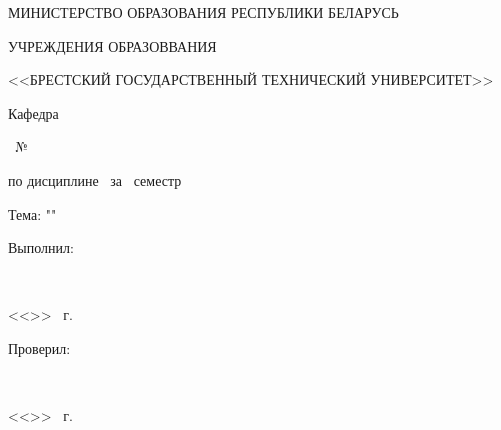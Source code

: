 \begin{center}
    МИНИСТЕРСТВО ОБРАЗОВАНИЯ РЕСПУБЛИКИ БЕЛАРУСЬ

    УЧРЕЖДЕНИЯ ОБРАЗОВВАНИЯ

    <<БРЕСТСКИЙ ГОСУДАРСТВЕННЫЙ ТЕХНИЧЕСКИЙ УНИВЕРСИТЕТ>>

    Кафедра \titlePageKafedra
\end{center}

\vfill

\begin{center}
    \titlePageWorkType~№\titlePageWorkNumber

    по дисциплине \titlePageLesson~за \titlePageSemestr~семестр

    Тема: "\titlePageTopic"
\end{center}

\vfill

\begin{flushright}
    \begin{minipage}[t]{7cm}
        Выполнил:

        \titlePageStudentType

        \titlePageStudentSurname~\titlePageStudentName

        <<\underline{\hspace{0.5cm}}>> \underline{\hspace{2cm}} \ESKDtheYear~г. 

        \hspace{0pt}

        Проверил:

        \titlePageTeacherType

        \titlePageTeacherSurname~\titlePageTeacherName

        <<\underline{\hspace{0.5cm}}>> \underline{\hspace{2cm}} \ESKDtheYear~г. 
    \end{minipage}
\end{flushright}

\vfill

\begin{center}
    \titlePageCity~\ESKDtheYear
\end{center}
